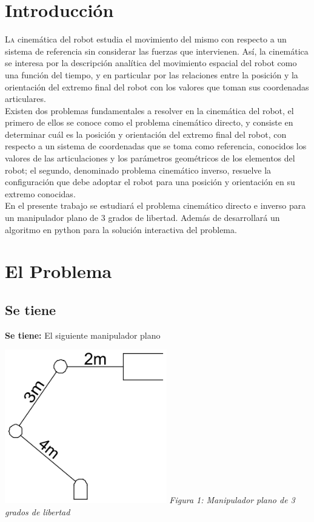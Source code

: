 \documentclass[twoside]{article}
\begin{document}
\begin{multicols}{2} %

\section{Introducción}

\lettrine[nindent=0em,lines=3]{L} a cinemática del robot estudia el movimiento del mismo con respecto a un sistema de referencia sin considerar las fuerzas que intervienen. Así, la cinemática se interesa por la descripción analítica del movimiento espacial del robot como una función del tiempo, y en particular por las relaciones entre la posición y la orientación del extremo final del robot con los valores que toman sus coordenadas articulares. \\
Existen dos problemas fundamentales a resolver en la cinemática del robot, el primero de ellos se conoce como el problema cinemático directo, y consiste en determinar cuál es la posición y orientación del extremo final del robot, con respecto a un sistema de coordenadas que se toma como referencia, conocidos los valores de las articulaciones y los parámetros geométricos de los elementos del robot; el segundo, denominado problema cinemático inverso, resuelve la configuración que debe adoptar el robot para una posición y orientación en su extremo conocidas. \\
En el presente trabajo se estudiará el problema cinemático directo e inverso para un manipulador plano de 3 grados de libertad.  Además de desarrollará un algoritmo en python para la solución interactiva del problema.


\section{El Problema}
\subsection{Se tiene}
\textbf{Se tiene:} El siguiente manipulador plano \\
\begin{center}
 \includegraphics[width=200pt,keepaspectratio=true]{./Robot.png}
  \textit{Figura 1: Manipulador plano de 3 grados de libertad}
\end{center}



\end{multicols}
\end{document}
